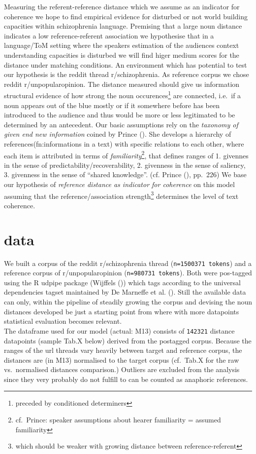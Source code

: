 \documentclass[
  12pt,
  oneside]{book}
\begin{document}
Measuring the referent-reference distance which we assume as an indicator for coherence we hope to find empirical evidence for disturbed or not world building capacities within schizophrenia language. Premising that a large noun distance indicates a low reference-referent association we hypothesise that in a language/ToM setting where the speakers estimation of the audiences context understanding capacities is disturbed we will find higer medium scores for the distance under matching conditions. An environment which has potential to test our hypothesis is the reddit thread r/schizophrenia. As reference corpus we chose reddit r/unpopularopinion.
The distance measured should give us information structural evidence of how strong the noun occurences\footnote{preceded by conditioned determiners} are connected, i.e.~if a noun appears out of the blue mostly or if it somewhere before has been introduced to the audience and thus would be more or less legitimated to be determined by an antecedent.
Our basic assumptions rely on the \emph{taxonomy of given end new information} coined by Prince (). She develops a hierarchy of references(fn:informations in a text) with specific relations to each other, where each item is attributed in terms of \emph{familiarity}\footnote{cf.~Prince: speaker assumptions about hearer familiarity = assumed familiarity}, that defines ranges of 1. givennes in the sense of predictability/recoverability, 2. givenness in the sense of saliency, 3. givenness in the sense of ``shared knowledge''. (cf. Prince (), pp.~226) We base our hypothesis of \emph{reference distance as indicator for coherence} on this model assuming that the reference/association strength\footnote{which should be weaker with growing distance between reference-referent} determines the level of text coherence.

\section{data}\label{data}

We built a corpus of the reddit r/schizophrenia thread (\texttt{n=1500371\ tokens}) and a reference corpus of r/unpopularopinion (\texttt{n=980731\ tokens}). Both were pos-tagged using the R udpipe package (Wijffels ()) which tags according to the universal dependencies tagset maintained by De Marneffe et al. (). Still the available data can only, within the pipeline of steadily growing the corpus and devising the noun distances developed be just a starting point from where with more datapoints statistical evaluation becomes relevant.\\
The dataframe used for our model (actual: M13) consists of \texttt{142321} distance datapoints (sample Tab.X below) derived from the postagged corpus. Because the ranges of the url threads vary heavily between target and reference corpus, the distances are (in M13) normalised to the target corpus (cf.~Tab.X for the raw vs.~normalised distances comparison.) Outliers are excluded from the analysis since they very probably do not fulfill to can be counted as anaphoric references.
\end{document}
